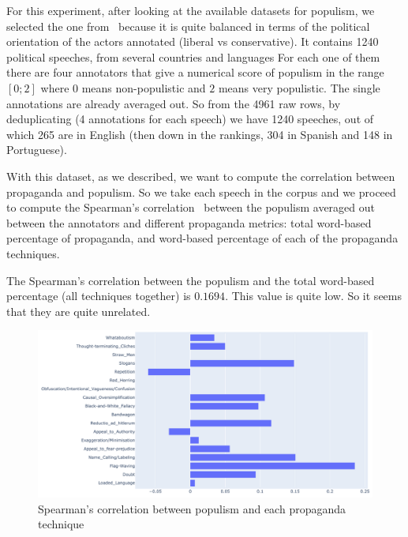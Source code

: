 For this experiment, after looking at the available datasets for populism, we selected the one from~\citet{hawkins2019global} because it is quite balanced in terms of the political orientation of the actors annotated (liberal vs conservative). It contains 1240 political speeches, from several countries and languages
For each one of them there are four annotators that give a numerical score of populism in the range $[0;2]$ where $0$ means non-populistic and $2$ means very populistic. The single annotations are already averaged out.
So from the 4961 raw rows, by deduplicating (4 annotations for each speech) we have 1240 speeches, out of which 265 are in English (then down in the rankings, 304 in Spanish and 148 in Portuguese).






With this dataset, as we described, we want to compute the 
correlation between propaganda and populism. So we take each speech in the corpus and we proceed to compute the Spearman's correlation~\citep{spearman1910correlation} between the  populism averaged out between the annotators and different propaganda metrics: total word-based percentage of propaganda, and word-based percentage of each of the propaganda techniques. 


The Spearman's correlation between the populism and the total word-based percentage (all techniques together) is $0.1694$. This value is quite low. So it seems that they are quite unrelated.

\begin{figure}[!htbp]
    \centering
    \includegraphics[width=\linewidth]{figures/populism_propaganda_correlation.pdf}
    \caption{Spearman's correlation between populism and each propaganda technique}
    \label{fig:populism_propaganda_correlation}
\end{figure}

